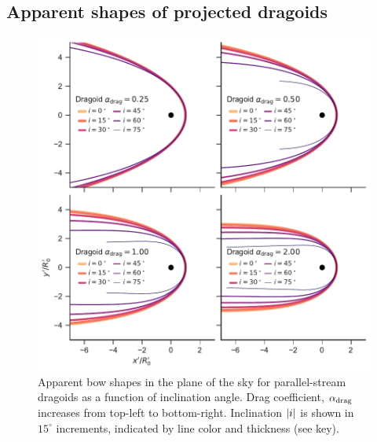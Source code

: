 


\subsection{Apparent shapes of projected dragoids}
\label{sec:dust-wave-apparent}

\begin{figure}
  \centering
  \includegraphics[width=\linewidth]{figs/test_xyprime_dragoid}
  \caption{Apparent bow shapes in the plane of the sky for
    parallel-stream dragoids as a function of inclination angle.  Drag
    coefficient, \(\alpha_{\text{drag}}\) increases from top-left to bottom-right.
    Inclination \(\lvert i\rvert\) is shown in \(15^\circ\) increments, indicated
    by line color and thickness (see key).}
  \label{fig:dragoid-xy-prime}
\end{figure}
